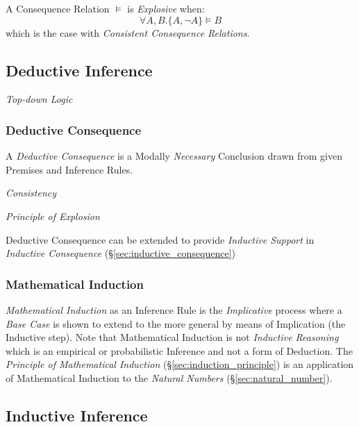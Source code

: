 A Consequence Relation $\vDash$ is \emph{Explosive} when:
\[
    \forall A, B. \{A, \neg A\} \vDash B
\]
which is the case with \emph{Consistent Consequence Relations}.




\subsection{Deductive Inference}\label{sec:deductive_inference}

\emph{Top-down Logic}

\subsubsection{Deductive Consequence}\label{sec:deductive_consequence}

A \emph{Deductive Consequence} is a Modally \emph{Necessary}
Conclusion drawn from given Premises and Inference Rules.

\emph{Consistency}

\emph{Principle of Explosion}

Deductive Consequence can be extended to provide \emph{Inductive
  Support} in \emph{Inductive Consequence}
(\S\ref{sec:inductive_consequence})



\subsubsection{Mathematical Induction}\label{sec:mathematical_induction}

\emph{Mathematical Induction} as an Inference Rule is the
\emph{Implicative} process where a \emph{Base Case} is shown to extend
to the more general by means of Implication (the Inductive step). Note
that Mathematical Induction is not \emph{Inductive Reasoning} which is
an empirical or probabilistic Inference and not a form of Deduction.
The \emph{Principle of Mathematical Induction}
(\S\ref{sec:induction_principle}) is an application of Mathematical
Induction to the \emph{Natural Numbers} (\S\ref{sec:natural_number}).



\subsection{Inductive Inference}\label{sec:inductive_inference}
\cite{hawthorne08}

